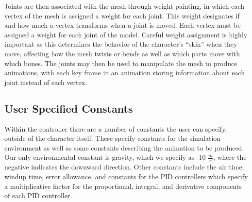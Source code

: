 Joints are then associated with the mesh through weight painting, in which each vertex of the mesh is assigned a weight for each joint.  This weight designates if and how much a vertex transforms when a joint is moved.  Each vertex must be assigned a weight for each joint of the model.  Careful weight assignment is highly important as this determines the behavior of the character's ``skin'' when they move, affecting how the mesh twists or bends as well as which parts move with which bones.  The joints may then be used to manipulate the mesh to produce animations, with each key frame in an animation storing information about each joint instead of each vertex. \cite{gamasutra_char_anim}

\subsection{User Specified Constants}
\label{subsection:user_constants}
Within the controller there are a number of constants the user can specify, outside of the character itself.  These specify constants for the simulation environment as well as some constants describing the animation to be produced.  Our only environmental constant is gravity, which we specify as -10 $\frac{m}{s^2}$, where the negative indicates the downward direction.  Other constants include the air time, windup time, error allowance, and constants for the PID controllers which specify a multiplicative factor for the proportional, integral, and derivative components of each PID controller.

